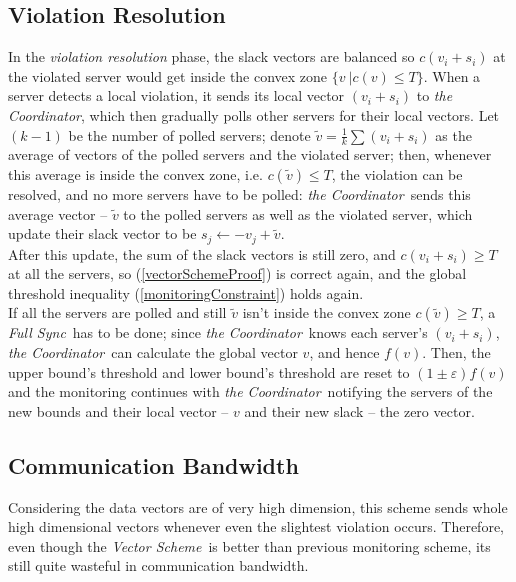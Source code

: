 \documentclass[10pt, conference]{IEEEtran}
\newcommand{\vectorScheme}{\textit{Vector Scheme}}
\newcommand{\fullSync}{\textit{Full Sync}}
\newcommand{\theCoordinator}{\textit{the Coordinator}}
\begin{document}
\subsection{Violation Resolution}
In the \textit{violation resolution} phase, the slack vectors are balanced so ${c(v_i+s_i)}$ at the violated server would get inside the convex zone ${\{v \ | c(v) \leq T\}}$. When a server detects a local violation, it sends its local vector ${(v_i + s_i)}$ to \theCoordinator , which then gradually polls other servers for their local vectors. Let ${(k-1)}$ be the number of polled servers; denote ${\widetilde{v} = \frac{1}{k}\sum (v_i + s_i)}$ as the average of vectors of the polled servers and the violated server; then, whenever this average is inside the convex zone, i.e. ${c(\widetilde{v}) \leq T}$, the violation can be resolved, and no more servers have to be polled: \theCoordinator \ sends this average vector -- ${\widetilde{v}}$ to the polled servers as well as the violated server, which update their slack vector to be ${s_j \leftarrow -v_j + \widetilde{v}}$. \\
After this update, the sum of the slack vectors is still zero, and ${c(v_i+s_i) \geq T}$ at all the servers, so (\ref{vectorSchemeProof}) is correct again, and the global threshold inequality (\ref{monitoringConstraint}) holds again. \\
If all the servers are polled and still ${\widetilde{v}}$ isn't inside the convex zone ${c(\widetilde{v}) \geq T}$, a \fullSync \ has to be done; since \theCoordinator \ knows each server's ${(v_i + s_i)}$, \theCoordinator \ can calculate the global vector $v$, and hence $f(v)$. Then, the upper bound's threshold and lower bound's threshold are reset to ${(1 \pm \varepsilon )f(v)}$ and the monitoring continues with \theCoordinator \ notifying the servers of the new bounds and their local vector -- $v$ and their new slack -- the zero vector.
\subsection{Communication Bandwidth}
Considering the data vectors are of very high dimension, this scheme sends whole high dimensional vectors whenever even the slightest violation occurs. Therefore, even though the \vectorScheme \  is better than previous monitoring scheme, its still quite wasteful in communication bandwidth.

\end{document}
